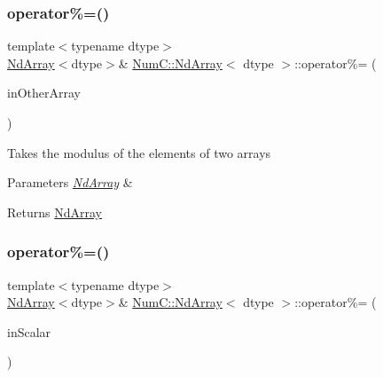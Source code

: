 \subsubsection{\texorpdfstring{operator\%=()}{operator\%=()}\hspace{0.1cm}{\footnotesize\ttfamily [1/2]}}
{\footnotesize\ttfamily template$<$typename dtype$>$ \\
\mbox{\hyperlink{class_num_c_1_1_nd_array}{Nd\+Array}}$<$dtype$>$\& \mbox{\hyperlink{class_num_c_1_1_nd_array}{Num\+C\+::\+Nd\+Array}}$<$ dtype $>$\+::operator\%= (\begin{DoxyParamCaption}\item[{const \mbox{\hyperlink{class_num_c_1_1_nd_array}{Nd\+Array}}$<$ dtype $>$ \&}]{in\+Other\+Array }\end{DoxyParamCaption})\hspace{0.3cm}{\ttfamily [inline]}}

Takes the modulus of the elements of two arrays


\begin{DoxyParams}{Parameters}
{\em \mbox{\hyperlink{class_num_c_1_1_nd_array}{Nd\+Array}}} & \\
\hline
\end{DoxyParams}
\begin{DoxyReturn}{Returns}
\mbox{\hyperlink{class_num_c_1_1_nd_array}{Nd\+Array}} 
\end{DoxyReturn}
\mbox{\label{class_num_c_1_1_nd_array_a36721fa821483a1f74598a51c7a84f60}} 
\subsubsection{\texorpdfstring{operator\%=()}{operator\%=()}\hspace{0.1cm}{\footnotesize\ttfamily [2/2]}}
{\footnotesize\ttfamily template$<$typename dtype$>$ \\
\mbox{\hyperlink{class_num_c_1_1_nd_array}{Nd\+Array}}$<$dtype$>$\& \mbox{\hyperlink{class_num_c_1_1_nd_array}{Num\+C\+::\+Nd\+Array}}$<$ dtype $>$\+::operator\%= (\begin{DoxyParamCaption}\item[{dtype}]{in\+Scalar }\end{DoxyParamCaption})\hspace{0.3cm}{\ttfamily [inline]}}

